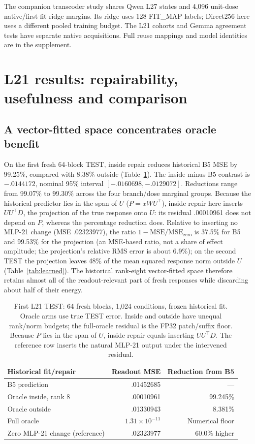 \documentclass[11pt]{article}
\begin{document}
The companion transcoder study shares Qwen L27 states and 4,096 unit-dose native/first-fit ridge margins. Its ridge uses 128 FIT\_MAP labels; Direct256 here uses a different pooled training budget. The L21 cohorts and Gemma agreement tests have separate native acquisitions. Full reuse mappings and model identities are in the supplement.

\section{L21 results: repairability, usefulness and comparison}
\subsection{A vector-fitted space concentrates oracle benefit}
On the first fresh 64-block TEST, inside repair reduces historical B5 MSE by 99.25\%, compared with 8.38\% outside (Table~\ref{tab:oracle}). The inside-minus-B5 contrast is $-.0144172$, nominal 95\% interval $[-.0160698,-.0129072]$. Reductions range from 99.07\% to 99.30\% across the four branch/dose marginal groups. Because the historical predictor lies in the span of $U$ ($P=xWU^\top$), inside repair here inserts $UU^\top D$, the projection of the true response onto $U$: its residual .00010961 does not depend on $P$, whereas the percentage reduction does. Relative to inserting no MLP-21 change (MSE .02323977), the ratio $1-\mathrm{MSE}/\mathrm{MSE}_{\text{zero}}$ is 37.5\% for B5 and 99.53\% for the projection (an MSE-based ratio, not a share of effect amplitude; the projection's relative RMS error is about 6.9\%); on the second TEST the projection leaves 48\% of the mean squared response norm outside $U$ (Table~\ref{tab:learned}). The historical rank-eight vector-fitted space therefore retains almost all of the readout-relevant part of fresh responses while discarding about half of their energy.

\begin{table}[ht]\centering\small
\begin{tabular}{lrr}\toprule Historical fit/repair & Readout MSE & Reduction from B5\\\midrule
B5 prediction & .01452685 & ---\\
Oracle inside, rank 8 & .00010961 & 99.245\%\\
Oracle outside & .01330943 & 8.381\%\\
Full oracle & $1.31\times10^{-11}$ & Numerical floor\\\midrule
Zero MLP-21 change (reference) & .02323977 & 60.0\% higher\\\bottomrule\end{tabular}
\caption{First L21 TEST: 64 fresh blocks, 1,024 conditions, frozen historical fit. Oracle arms use true TEST error. Inside and outside have unequal rank/norm budgets; the full-oracle residual is the FP32 patch/suffix floor. Because $P$ lies in the span of $U$, inside repair equals inserting $UU^\top D$. The reference row inserts the natural MLP-21 output under the intervened residual.}\label{tab:oracle}
\end{table}
\end{document}
